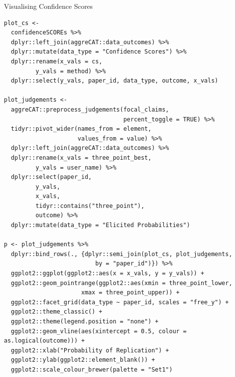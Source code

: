 \documentclass[article]{jss}
\begin{document}
\begin{codelisting}

\caption{Visualising Confidence Scores}

\hypertarget{lst-confidencescores}{%
\label{lst-confidencescores}}%
\begin{verbatim}
plot_cs <- 
  confidenceSCOREs %>% 
  dplyr::left_join(aggreCAT::data_outcomes) %>% 
  dplyr::mutate(data_type = "Confidence Scores") %>% 
  dplyr::rename(x_vals = cs,
         y_vals = method) %>% 
  dplyr::select(y_vals, paper_id, data_type, outcome, x_vals)

plot_judgements <- 
  aggreCAT::preprocess_judgements(focal_claims,
                                  percent_toggle = TRUE) %>% 
  tidyr::pivot_wider(names_from = element, 
                     values_from = value) %>%
  dplyr::left_join(aggreCAT::data_outcomes) %>% 
  dplyr::rename(x_vals = three_point_best,
         y_vals = user_name) %>% 
  dplyr::select(paper_id, 
         y_vals, 
         x_vals, 
         tidyr::contains("three_point"),
         outcome) %>% 
  dplyr::mutate(data_type = "Elicited Probabilities")

p <- plot_judgements %>%  
  dplyr::bind_rows(., {dplyr::semi_join(plot_cs, plot_judgements,
                          by = "paper_id")}) %>% 
  ggplot2::ggplot(ggplot2::aes(x = x_vals, y = y_vals)) +
  ggplot2::geom_pointrange(ggplot2::aes(xmin = three_point_lower, 
                      xmax = three_point_upper)) +
  ggplot2::facet_grid(data_type ~ paper_id, scales = "free_y") + 
  ggplot2::theme_classic() +
  ggplot2::theme(legend.position = "none") +
  ggplot2::geom_vline(aes(xintercept = 0.5, colour = as.logical(outcome))) +
  ggplot2::xlab("Probability of Replication") +
  ggplot2::ylab(ggplot2::element_blank()) +
  ggplot2::scale_colour_brewer(palette = "Set1")
\end{verbatim}

\end{codelisting}

\newpage

\newpage{}


  
\end{document}
